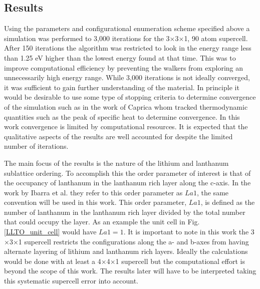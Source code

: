 \documentclass[aps,pre,reprint,superscriptaddress,showkeys]{revtex4-1}
\begin{document}
\subsection{Results}
  Using the parameters and configurational enumeration scheme specified above a simulation was performed to 3,000 iterations for  the 3$\times$3$\times$1,  90 atom supercell. After 150 iterations the algorithm was restricted to look  in the energy range less than 1.25 eV higher than the lowest energy found at that time. This was to improve computational efficiency by preventing the walkers from exploring an unnecessarily high energy range. While 3,000 iterations is not ideally converged, it was sufficient to gain further understanding of the material. In principle it would be desirable to use some type of stopping criteria to determine convergence of the simulation such as in the work of Caprica\cite{halting_wang_and_landau} whom tracked thermodynamic quantities such as the peak of specific heat to determine convergence. In this work convergence is limited by computational resources. 
It is expected that the qualitative aspects of the results are well accounted for despite the limited number of iterations. 
  
The main focus of the results is the nature of the lithium and lanthanum sublattice ordering. To accomplish this the order parameter of interest is that of the occupancy of lanthanum in the lanthanum rich layer along the c-axis.  In the work by Ibarra et al. \cite{P4mmmstrucuture} they refer to this order parameter as $La1$, the same convention will be used in this work. This order parameter, $La1$, is defined as the number of lanthanum in the lanthanum rich layer divided by the total number that could occupy the layer. As an example the unit cell in Fig. \ref{LLTO_unit_cell} would have $La1=1$. It is important to note in this work the 3$\times$3$\times$1 supercell restricts the configurations along the a- and b-axes from having alternate layering of lithium and lanthanum rich layers. Ideally the calculations would be done with at least a 4$\times$4$\times$1 supercell but the computational effort is beyond the scope of this work. The results later will have to be interpreted taking this systematic supercell error into account.  
  
\end{document}
